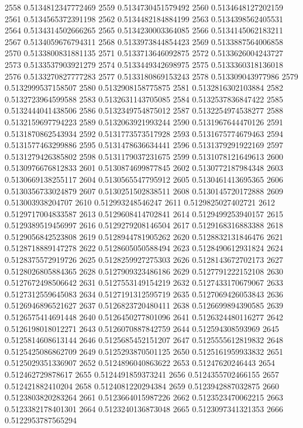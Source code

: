 2558 0.5134812347772469
2559 0.5134730451579492
2560 0.5134648127202159
2561 0.5134565372391198
2562 0.5134482184884199
2563 0.5134398562405531
2564 0.5134314502666265
2565 0.5134230003364085
2566 0.5134145062183211
2567 0.5134059676794311
2568 0.5133973844854423
2569 0.5133887564006858
2570 0.5133800831881135
2571 0.5133713646092875
2572 0.5133626004243727
2573 0.5133537903921279
2574 0.5133449342698975
2575 0.5133360318136018
2576 0.5133270827777283
2577 0.5133180869153243
2578 0.513309043977986
2579 0.5132999537158507
2580 0.5132908158775875
2581 0.5132816302103884
2582 0.5132723964599588
2583 0.5132631143705085
2584 0.5132537836847422
2585 0.5132444041438506
2586 0.5132349754875012
2587 0.5132254974538277
2588 0.5132159697794223
2589 0.5132063921993244
2590 0.5131967644470126
2591 0.5131870862543934
2592 0.5131773573517928
2593 0.5131675774679463
2594 0.5131577463299886
2595 0.5131478636634441
2596 0.5131379291922169
2597 0.5131279426385802
2598 0.5131179037231675
2599 0.5131078121649613
2600 0.5130976676812833
2601 0.5130874699877845
2602 0.5130772187984348
2603 0.5130669138255117
2604 0.5130565547795912
2605 0.5130461413695365
2606 0.5130356733024879
2607 0.5130251502838511
2608 0.5130145720172888
2609 0.513003938204707
2610 0.512993248546247
2611 0.5129825027402721
2612 0.5129717004833587
2613 0.5129608414702841
2614 0.5129499253940157
2615 0.5129389519456997
2616 0.5129279208146504
2617 0.5129168316883388
2618 0.5129056842523808
2619 0.5128944781905262
2620 0.5128832131846476
2621 0.5128718889147278
2622 0.5128605050588494
2623 0.5128490612931824
2624 0.5128375572919726
2625 0.5128259927275303
2626 0.5128143672702173
2627 0.5128026805884365
2628 0.5127909323486186
2629 0.5127791222152108
2630 0.5127672498506642
2631 0.5127553149154219
2632 0.5127433170679067
2633 0.5127312559645083
2634 0.5127191312595719
2635 0.5127069426053843
2636 0.5126946896521627
2637 0.5126823720480411
2638 0.5126699894390585
2639 0.5126575414691448
2640 0.5126450277801096
2641 0.5126324480116277
2642 0.5126198018012271
2643 0.5126070887842759
2644 0.512594308593969
2645 0.5125814608613144
2646 0.5125685452151207
2647 0.5125555612819832
2648 0.5125425086862709
2649 0.5125293870501125
2650 0.5125161959933832
2651 0.5125029351336907
2652 0.5124896040863622
2653 0.51247620246443
2654 0.512462729878617
2655 0.5124491859373241
2656 0.5124355702466155
2657 0.512421882410204
2658 0.5124081220294384
2659 0.5123942887032875
2660 0.5123803820283264
2661 0.5123664015987226
2662 0.5123523470062215
2663 0.5123382178401301
2664 0.5123240136873048
2665 0.5123097341321353
2666 0.5122953787565294
